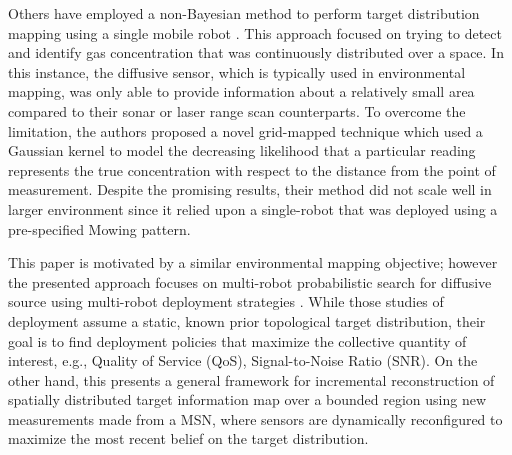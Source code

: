 \documentclass[letterpaper, 10 pt, conference]{ieeeconf}
\newcommand{\Ram}[1]{{\normalsize{\textbf{({\color{green}Ram:\ }#1)}}}}
\newcommand{\HJ}[1]{{\color{black}{#1}}}
\begin{document}
Others have employed a non-Bayesian method to perform target distribution mapping using a single mobile robot \cite{lilienthal2009statistical}.
This approach focused on trying to detect and identify gas concentration that was continuously distributed over a space.
In this instance, the diffusive sensor, which is typically used in environmental mapping, was only able to provide information about a relatively small area compared to their sonar or laser range scan counterparts.
To overcome the limitation, the authors proposed a novel grid-mapped technique which used a Gaussian kernel to model the decreasing likelihood that a particular reading represents the true concentration with respect to the distance from the point of measurement. 
Despite the promising results, their method did not scale well in larger environment since it relied upon a single-robot that was deployed using a pre-specified Mowing pattern.


This paper is motivated by a similar environmental mapping objective; however the presented approach focuses on multi-robot probabilistic search for diffusive source using multi-robot deployment strategies \cite{cortes_coverage_2004}. 
While those studies of deployment assume a static, known prior topological target distribution, their goal is to find deployment policies that maximize the collective quantity of interest, e.g., Quality of Service (QoS), Signal-to-Noise Ratio (SNR).
On the other hand, this presents a general framework for incremental reconstruction of spatially distributed target information map over a bounded region using new measurements made from a MSN, where sensors are dynamically reconfigured to maximize the most recent belief on the target distribution.
\end{document}
